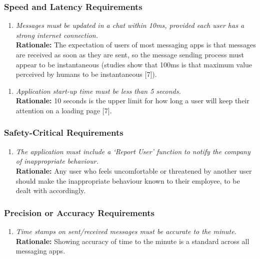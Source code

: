 \documentclass[]{article}
\begin{document}
\begin{enumerate}[{\bf BE1.}]
\subsubsection{Speed and Latency Requirements}
\label{ssub:speed_and_latency_requirements}
\begin{enumerate}[{PR-SL}1. ]
    \item \emph{Messages must be updated in a chat within 10ms, provided each user has a strong internet connection.}\\
        {\bf Rationale:} The expectation of users of most messaging apps is that messages are received as soon as they are sent, so the message sending process must appear to be instantaneous (studies show that 100ms is that maximum value perceived by humans to be instantaneous [7]).
\end{enumerate}
\begin{enumerate}[{PR-SL}2. ]
    \item \emph{Application start-up time must be less than 5 seconds.}\\
        {\bf Rationale:} 10 seconds is the upper limit for how long a user will keep their attention on a loading page [7].
\end{enumerate}


\subsubsection{Safety-Critical Requirements}
\label{ssub:safety_critical_requirements}
\begin{enumerate}[{PR-SC}1. ]
    \item \emph{The application must include a ‘Report User’ function to notify the company of inappropriate behaviour.}\\
    {\bf Rationale:} Any user who feels uncomfortable or threatened by another user should make the inappropriate behaviour known to their employee, to be dealt with accordingly.
\end{enumerate}


\subsubsection{Precision or Accuracy Requirements}
\label{ssub:precision_or_accuracy_requirements}
\begin{enumerate}[{PR-PA}1. ]
    \item \emph{Time stamps on sent/received messages must be accurate to the minute.}\\
    {\bf Rationale:} Showing accuracy of time to the minute is a standard across all messaging apps.
\end{enumerate}



\end{enumerate}
\end{document}
